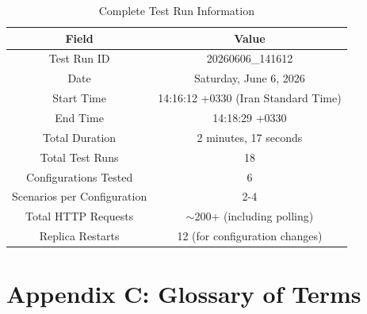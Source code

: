 \documentclass[10pt,a4paper]{article}
\begin{document}
\begin{table}[H]
\centering
\caption{Complete Test Run Information}
\begin{tabular}{|c|c|}
\hline
\textbf{Field} & \textbf{Value} \\
\hline
Test Run ID & 20260606\_141612 \\
Date & Saturday, June 6, 2026 \\
Start Time & 14:16:12 +0330 (Iran Standard Time) \\
End Time & 14:18:29 +0330 \\
Total Duration & 2 minutes, 17 seconds \\
Total Test Runs & 18 \\
Configurations Tested & 6 \\
Scenarios per Configuration & 2-4 \\
Total HTTP Requests & $\sim$200+ (including polling) \\
Replica Restarts & 12 (for configuration changes) \\
\hline
\end{tabular}
\end{table}

\section{Appendix C: Glossary of Terms}
\end{document}
